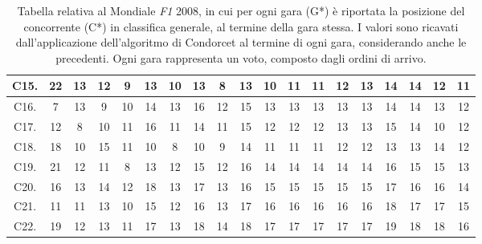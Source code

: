 \documentclass[12pt,a4paper,openright,twoside]{book}
\begin{document}
\begin{table}[H]
{\begin{tabular}{|c|c|c|c|c|c|c|c|c|c|c|c|c|c|c|c|c|c|c|}
    C15.  & 22 & 13 & 12 & 9 & 13 & 10 & 13 & 8 & 13 & 10 & 11 & 11 & 12 & 13 & 14 & 14 & 12 & 11 \\ \hline
    C16.  & 7 & 13 & 9 & 10 & 14 & 13 & 16 & 12 & 15 & 13 & 13 & 13 & 13 & 13 & 14 & 14 & 13 & 12 \\ \hline
    C17.  & 12 & 8 & 10 & 11 & 16 & 11 & 14 & 11 & 15 & 12 & 12 & 12 & 13 & 13 & 15 & 14 & 10 & 12 \\ \hline
    C18. & 18 & 10 & 15 & 11 & 10 & 8 & 10 & 9 & 14 & 11 & 11 & 11 & 12 & 12 & 13 & 13 & 14 & 12 \\ \hline
    C19.  & 21 & 12 & 11 & 8 & 13 & 12 & 15 & 12 & 16 & 14 & 14 & 14 & 14 & 14 & 16 & 15 & 15 & 13 \\ \hline
    C20.  & 16 & 13 & 14 & 12 & 18 & 13 & 17 & 13 & 16 & 15 & 15 & 15 & 15 & 15 & 17 & 16 & 16 & 14 \\ \hline
    C21. & 11 & 11 & 13 & 10 & 15 & 12 & 16 & 13 & 17 & 16 & 16 & 16 & 16 & 16 & 18 & 17 & 17 & 15 \\ \hline
    C22.  & 19 & 12 & 13 & 11 & 17 & 13 & 18 & 14 & 18 & 17 & 17 & 17 & 17 & 17 & 19 & 18 & 18 & 16 \\ \hline
    \end{tabular}}
    \endgroup
  
    \caption{Tabella relativa al Mondiale \textit{F1} 2008, in cui per ogni gara (G*)  è riportata la posizione del concorrente (C*) in classifica generale, al termine della gara stessa.
    I valori sono ricavati dall'applicazione dell'algoritmo di Condorcet al termine di ogni gara, considerando anche le precedenti.
    Ogni gara rappresenta un voto, composto dagli ordini di arrivo.
    }
    \label{table:classifichegeneralicondorcet2008tabella}
\end{table}
\end{document}
